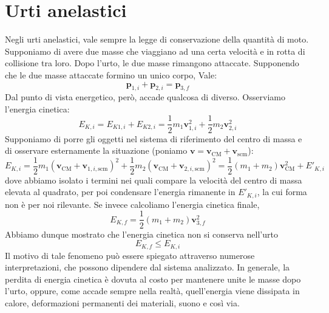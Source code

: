 \section{Urti anelastici}
Negli urti anelastici, vale sempre la legge di conservazione della quantità
di moto. Supponiamo di avere due masse che viaggiano ad una certa velocità
e in rotta di collisione tra loro. Dopo l'urto, le due masse rimangono
attaccate. Supponendo che le due masse attaccate formino un unico corpo, Vale:
\[ \mathbf{p}_{1,i} + \mathbf{p}_{2,i} = \mathbf{p}_{3,f} \]
Dal punto di vista energetico, però, accade qualcosa di diverso. Osserviamo
l'energia cinetica:
\[ E_{K,i} = E_{K1, i} + E_{K2, i} = \frac12 m_1\mathbf{v}_{1,i}^2 + \frac12 m_2\mathbf{v}_{2,i}^2\]
Supponiamo di porre gli oggetti nel sistema di riferimento del centro di massa
e di osservare esternamente la situazione (poniamo $\mathbf{v} = \mathbf{v}_\text{CM} + \mathbf{v}_\text{scm}$):
\[ E_{K,i} = \frac12 m_1(\textbf{v}_\text{CM} + \mathbf{v}_{1,i,\text{scm}})^2 + \frac12 m_2(\textbf{v}_\text{CM} + \mathbf{v}_{2,i,\text{scm}})^2 = \frac12(m_1 + m_2)\mathbf{v}_\text{CM}^2 + E'_{K,i} \]
dove abbiamo isolato i termini nei quali compare la velocità del centro di massa
elevata al quadrato, per poi condensare l'energia rimanente in $E'_{K,i}$,
la cui forma non è per noi rilevante. Se invece calcoliamo l'energia cinetica
finale,
\[ E_{K,f} = \frac12 (m_1 + m_2)\mathbf{v}_{3,f}^2 \]
Abbiamo dunque mostrato che l'energia cinetica non si conserva nell'urto
\[ E_{K,f} \leq E_{K,i} \]
Il motivo di tale fenomeno può essere spiegato attraverso numerose
interpretazioni, che possono dipendere dal sistema analizzato. In generale,
la perdita di energia cinetica è dovuta al costo per mantenere unite le
masse dopo l'urto, oppure, come accade sempre nella realtà, quell'energia
viene dissipata in calore, deformazioni permanenti dei materiali, suono e
così via.